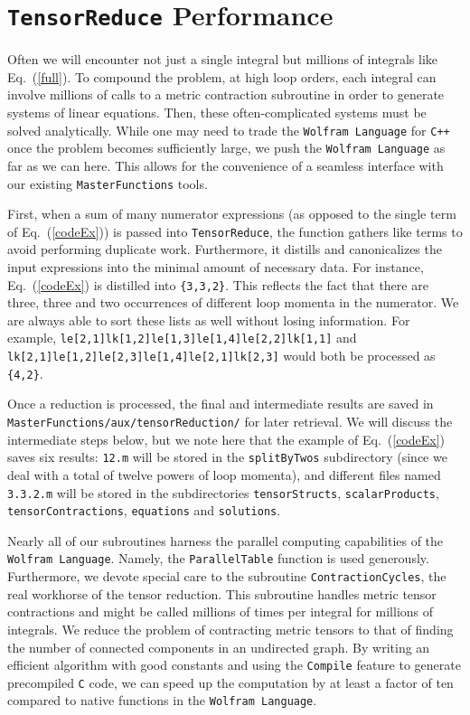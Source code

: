 \documentclass[aps,prd,preprint,eqsecnum,tightenlines,nofootinbib,showpacs]{revtex4}
\def\eqn#1{Eq.~({\ref{#1}})}
\begin{document}
\section{\texttt{T\lowercase{ensor}R\lowercase{educe}} Performance}
\label{performance}

Often we will encounter not just a single integral but millions of integrals like
\eqn{full}. To compound the problem, at high loop orders, each integral can involve
millions of calls to a metric contraction subroutine in order to generate systems of linear equations.
Then, these often-complicated systems must be solved analytically. While one may need
to trade the \texttt{Wolfram Language} for \texttt{C++} once the problem becomes sufficiently
large, we push the \texttt{Wolfram Language} as far as we can here. This allows for
the convenience of a seamless interface with our existing \texttt{MasterFunctions} tools.

First, when a sum  of many numerator expressions (as opposed to the single term of \eqn{codeEx}) is passed into \texttt{TensorReduce}, the function gathers like terms to avoid performing duplicate work. Furthermore,
it distills and canonicalizes the input expressions into the minimal amount of necessary data. For instance, \eqn{codeEx} is distilled into \texttt{\{3,3,2\}}. This reflects the fact that  there are three, 
three and two occurrences of different loop momenta in the numerator. We are always able to sort these 
lists as well without losing information. For example, \texttt{le[2,1]lk[1,2]le[1,3]le[1,4]le[2,2]lk[1,1]} and \texttt{lk[2,1]le[1,2]le[2,3]le[1,4]le[2,1]lk[2,3]} would both
be processed as \texttt{\{4,2\}}.

Once a reduction is processed, the final and intermediate results are saved 
in \texttt{MasterFunctions/aux/tensorReduction/} for later retrieval. We will discuss the intermediate
steps below, but we note here that the example of \eqn{codeEx} saves six results: 
\texttt{12.m} will be stored in
the \texttt{splitByTwos} subdirectory (since we deal with a total of twelve powers of loop momenta),
and different files named \texttt{3.3.2.m} will be stored in the subdirectories
\texttt{tensorStructs}, \texttt{scalarProducts}, \texttt{tensorContractions}, \texttt{equations}
and \texttt{solutions}.

Nearly all of our subroutines harness the parallel computing capabilities of the \texttt{Wolfram Language}.
Namely, the \texttt{ParallelTable} function is used generously. Furthermore, we devote special care to
the subroutine \texttt{ContractionCycles}, the real workhorse of the tensor reduction. This subroutine
handles metric tensor contractions and  might be called millions of times per integral for millions of integrals.
We reduce the problem of contracting metric tensors to that of finding the number of 
connected components in an undirected graph. By writing an efficient algorithm with good constants
and using the \texttt{Compile} feature to generate precompiled \texttt{C} code, we can speed up
the computation by at least a factor of ten compared to native functions in the \texttt{Wolfram Language}.
\end{document}
